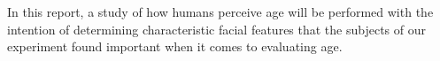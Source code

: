 In this report, a study of how humans perceive age will be performed with the intention of determining characteristic facial features that the subjects of our experiment found important when it comes to evaluating age. 
